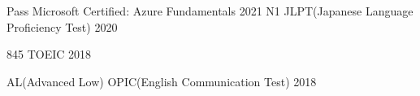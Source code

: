 

\begin{cvhonors}

  \cvhonor
    {Pass} %
    {Microsoft Certified: Azure Fundamentals} %
    {} %
    {2021} %
  \cvhonor
    {N1} %
    {JLPT(Japanese Language Proficiency Test)} %
    {} %
    {2020} %
    
  \cvhonor
    {845} %
    {TOEIC} %
    {} %
    {2018} %

  \cvhonor
    {AL(Advanced Low)} %
    {OPIC(English Communication Test)} %
    {} %
    {2018} %



\end{cvhonors}
